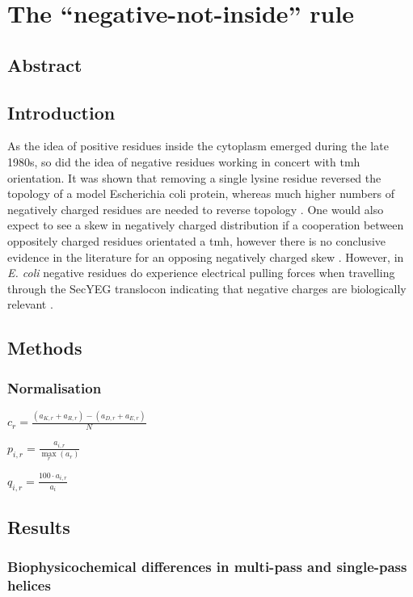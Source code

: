 
\chapter{The ``negative-not-inside'' rule}
\section{Abstract}

\section{Introduction}
As the idea of positive residues inside the cytoplasm emerged during the late 1980s, so did the idea of negative residues working in concert with \gls{tmh} orientation. It was shown that removing a single lysine residue reversed the topology of a model Escherichia coli protein, whereas much higher numbers of negatively charged residues are needed to reverse topology \cite{Nilsson1990}. One would also expect to see a skew in negatively charged distribution if a cooperation between oppositely charged residues orientated a \gls{tmh}, however there is no conclusive evidence in the literature for an opposing negatively charged skew \cite{Granseth2005, Nilsson2005, Sharpe2010, Baeza-Delgado2013, Pogozheva2013}. However, in {\it E. coli} negative residues do experience electrical pulling forces when travelling through the SecYEG translocon indicating that negative charges are biologically relevant \cite{Ismail2015}.

\section{Methods}

\subsection{Normalisation}

$c_r=\frac{(a_{K,r}+a_{R,r})-(a_{D,r}+a_{E,r})}{N}$

$p_{i,r}=\frac{a_{i,r}}{\underset{r}{\max}{(a_r)}}$

$q_{i,r}=\frac{100·a_{i,r}}{a_i}$

\section{Results}
\subsection{Biophysicochemical differences in multi-pass and single-pass helices}
